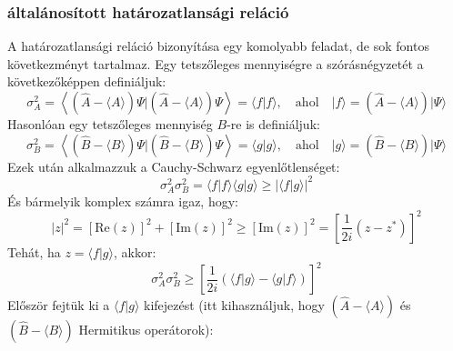 \documentclass[../main.tex]{subfiles}
\begin{document}
\subsubsection{általánosított határozatlansági reláció}
A határozatlansági reláció bizonyítása egy komolyabb feladat, de sok fontos következményt tartalmaz. Egy tetszőleges mennyiségre a szórásnégyzetét a következőképpen definiáljuk:
\begin{equation}
    \sigma^2_A = \left\langle (\hat{A} - \langle A \rangle) \Psi | (\hat{A} - \langle A \rangle) \Psi \right\rangle = \langle f | f \rangle, \quad \text{ahol} \quad |f\rangle = (\hat{A} - \langle A \rangle) |\Psi \rangle
\end{equation}
Hasonlóan egy tetszőleges mennyiség $B$-re is definiáljuk:
\begin{equation}
    \sigma^2_B = \left\langle (\hat{B} - \langle B \rangle) \Psi | (\hat{B} - \langle B \rangle) \Psi \right\rangle = \langle g | g \rangle, \quad \text{ahol} \quad |g\rangle = (\hat{B} - \langle B \rangle) |\Psi \rangle
\end{equation}
Ezek után alkalmazzuk a Cauchy-Schwarz egyenlőtlenséget:
\begin{equation}
    \sigma_A^2 \sigma_B^2 = \langle f | f \rangle \langle g | g \rangle \geq |\langle f | g \rangle|^2
\end{equation}
És bármelyik komplex számra igaz, hogy:
\begin{equation}
    |z|^2 = [\text{Re}(z)]^2 + [\text{Im}(z)]^2 \geq [\text{Im}(z)]^2 = \left[\frac{1}{2i} (z - z^*) \right]^2
\end{equation}
Tehát, ha $z = \langle f | g \rangle$, akkor:
\begin{equation}
    \sigma_A^2 \sigma_B^2 \geq \left[ \frac{1}{2i} \left( \langle f | g \rangle - \langle g | f \rangle \right) \right]^2
\end{equation}
Először fejtük ki a $\langle f | g \rangle$ kifejezést (itt kihasználjuk, hogy $\left(\hat{A} - \langle A \rangle\right)$ és $\left(\hat{B} - \langle B \rangle\right)$ Hermitikus operátorok):
\end{document}
